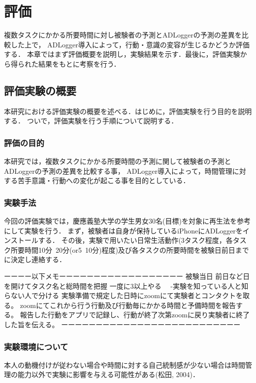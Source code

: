 \chapter{評価}
複数タスクにかかる所要時間に対し被験者の予測とADLoggerの予測の差異を比較した上で，
ADLogger導入によって，行動・意識の変容が生じるかどうか評価する．
本章ではまず評価概要を説明し，実験結果を示す．最後に，評価実験から得られた結果をもとに考察を行う．

\section{評価実験の概要}
本研究における評価実験の概要を述べる．はじめに，評価実験を行う目的を説明する．
ついで，評価実験を行う手順について説明する．

\subsection{評価の目的}
本研究では，複数タスクにかかる所要時間の予測に関して被験者の予測とADLoggerの予測の差異を比較する事，
ADLogger導入によって，時間管理に対する苦手意識・行動への変化が起こる事を目的としている．

\subsection{実験手法}
今回の評価実験では，慶應義塾大学の学生男女30名(目標)を対象に再生法\cite{Oguro1961}を参考にして実験を行う．
まず，被験者は自身が保持しているiPhoneにADLoggerをインストールする．
その後，実験で用いたい日常生活動作(3タスク程度，各タスク所要時間10分~20分(or5~10分)程度)及び各タスクの所要時間を被験日前日までに決定し連絡する．

ーーーー以下メモーーーーーーーーーーーーーーーーーー
被験当日
前日など日を開けてタスク名と総時間を把握
一度に3以上やる
　-実験を知っている人と知らない人で分ける
実験準備で規定した日時にzoomにて実験者とコンタクトを取る。
zoomにてこれから行う行動及び行動毎にかかる時間と予備時間を報告する。
報告した行動をアプリで記録し、行動が終了次第zoomに戻り実験者に終了した旨を伝える。
ーーーーーーーーーーーーーーーーーーーーーーーーーー

\subsection{実験環境について}
本人の動機付けが従わない場合や時間に対する自己統制感が少ない場合は時間管理の能力以外で実験に影響を与える可能性がある(松田, 2004)．


